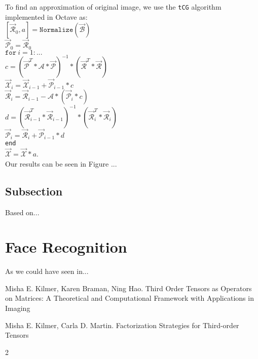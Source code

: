 \documentclass[twoside]{article}
\newcommand{\code}[1]{\texttt{#1}}
\begin{document}
\begin{multicols}{2}
To find an approximation of original image, we use the \code{tCG} algorithm implemented in Octave as:\\
$[\overrightarrow{\mathcal{R}}_0,a] = \code{Normalize}(\overrightarrow{\mathcal{B}})$\\
$\overrightarrow{\mathcal{P}}_0 = \overrightarrow{\mathcal{R}}_0$\\
$\code{for}\ i=1:...$\\
\indent $c = (\overrightarrow{\mathcal{P}}^T \ast \mathcal{A} \ast \overrightarrow{\mathcal{P}})^{-1} \ast (\overrightarrow{\mathcal{R}}^T \ast \overrightarrow{\mathcal{R}})$\\
\indent $\overrightarrow{\mathcal{X}}_i = \overrightarrow{\mathcal{X}}_{i-1} + \overrightarrow{\mathcal{P}}_{i-1} \ast c$\\
\indent $\overrightarrow{\mathcal{R}}_i = \overrightarrow{\mathcal{R}}_{i-1} - \mathcal{A} \ast (\overrightarrow{\mathcal{P}}_i \ast c)$\\
\indent $d = (\overrightarrow{\mathcal{R}}^T_{i-1} \ast \overrightarrow{\mathcal{R}}_{i-1})^{-1} \ast (\overrightarrow{\mathcal{R}}^T_i \ast \overrightarrow{\mathcal{R}}_i)$\\
\indent $\overrightarrow{\mathcal{P}}_i = \overrightarrow{\mathcal{R}}_i + \overrightarrow{\mathcal{P}}_{i-1} \ast d$\\
\code{end}\\
$\overrightarrow{\mathcal{X}} = \overrightarrow{\mathcal{X}} \ast a$.\\

\noindent Our results can be seen in Figure ...

\subsection{Subsection}
Based on...


\section{Face Recognition}
As we could have seen in...





\begin{thebibliography}{99}

Misha E. Kilmer, Karen Braman, Ning Hao.
\newblock Third Order Tensors as Operators on Matrices: A
Theoretical and Computational Framework with
Applications in Imaging

Misha E. Kilmer, Carla D. Martin.
\newblock Factorization Strategies for Third-order Tensors

 
\end{thebibliography}


\end{multicols}{2}
\end{document}

